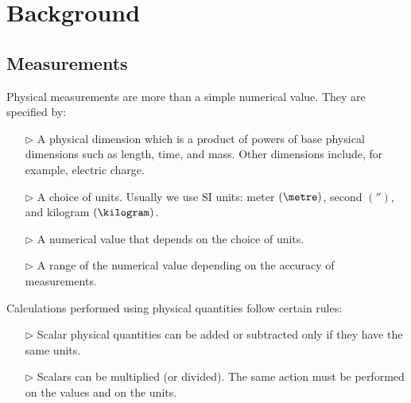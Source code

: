 
\label{lab:Intro}
\section{Background}

\subsection{Measurements}

Physical measurements are more than a simple numerical value. They are specified by:
\begin{enumerate}
\item[$\triangleright$] A physical dimension which is a product of powers of base physical dimensions such as length, time, and mass. Other dimensions include, for example, electric charge. 

\item[$\triangleright$] A choice of units. Usually we use SI units: meter \((\metre)\), second \((\second)\), and kilogram  \((\kilogram)\). 

\item[$\triangleright$] A numerical value that depends on the choice of units.

\item[$\triangleright$] A range of the numerical value depending on the accuracy of measurements. 
\end{enumerate}
Calculations performed using physical quantities follow certain rules: 
\begin{enumerate}

\item[$\triangleright$] Scalar physical quantities can be added or subtracted only if they have the same units. 
\item[$\triangleright$] Scalars can be multiplied (or divided). The same action must be performed on the values and on the units.

\end{enumerate}


